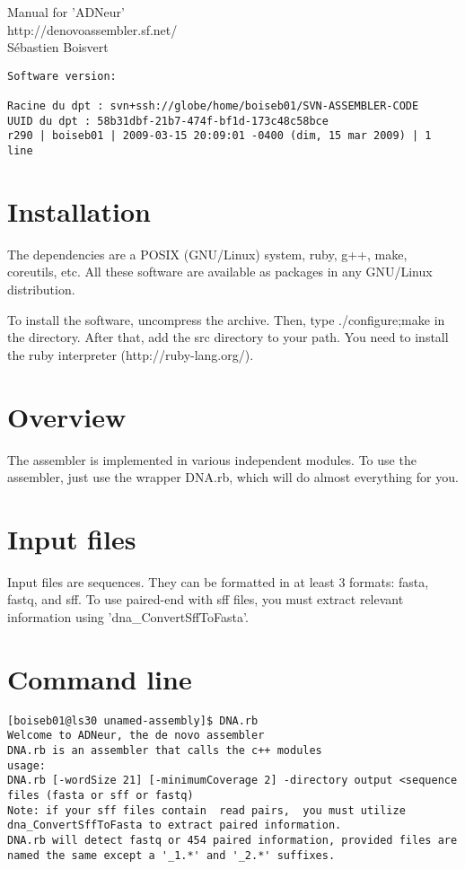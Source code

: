 \documentclass{article}
\begin{document}
Manual for 'ADNeur'\\
http://denovoassembler.sf.net/ \\
Sébastien Boisvert \\

\begin{verbatim}
Software version:

Racine du dpt : svn+ssh://globe/home/boiseb01/SVN-ASSEMBLER-CODE
UUID du dpt : 58b31dbf-21b7-474f-bf1d-173c48c58bce
r290 | boiseb01 | 2009-03-15 20:09:01 -0400 (dim, 15 mar 2009) | 1 line
\end{verbatim}


\tableofcontents
\section{Installation}

The dependencies are a POSIX (GNU/Linux) system, ruby, g++, make, coreutils, etc. All these software are available as packages in any GNU/Linux distribution.

To install the software, uncompress the archive. Then, type ./configure;make in
the directory. After that, add the src directory to your path.
You need to install the ruby interpreter (http://ruby-lang.org/).

\section{Overview}

The assembler is implemented in various independent modules.
To use the assembler, just use the wrapper DNA.rb, which will
do almost everything for you.

\section{Input files}

Input files are sequences. They can be formatted in at least 3 formats: fasta, fastq, and sff.
To use paired-end with sff files, you must extract relevant information using
'dna\_ConvertSffToFasta'.

\section{Command line}

\begin{verbatim}
[boiseb01@ls30 unamed-assembly]$ DNA.rb 
Welcome to ADNeur, the de novo assembler
DNA.rb is an assembler that calls the c++ modules
usage:
DNA.rb [-wordSize 21] [-minimumCoverage 2] -directory output <sequence files (fasta or sff or fastq)
Note: if your sff files contain  read pairs,  you must utilize dna_ConvertSffToFasta to extract paired information.
DNA.rb will detect fastq or 454 paired information, provided files are named the same except a '_1.*' and '_2.*' suffixes.
\end{verbatim}
\end{document}
